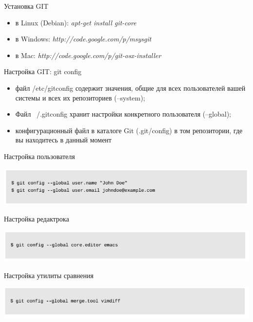 \documentclass{beamer}
\begin{document}
\begin{frame}
\begin{block}{Установка GIT}
\begin{itemize}
\item в Linux (Debian): \textit{apt-get install git-core}
\item в Windows: \textit{http://code.google.com/p/msysgit}
\item в Mac: \textit{http://code.google.com/p/git-osx-installer}
\end{itemize}
\end{block}
\begin{block}{Настройка GIT: git config}
\begin{itemize}
\item файл /etc/gitconfig содержит значения, общие для всех пользователей вашей системы
и всех их репозиториев (--system);
\item Файл ~/.gitconfig хранит настройки конкретного пользователя (--global);
\item конфигурационный файл в каталоге Git (.git/config) в том репозитории, где вы
находитесь в данный момент 
\end{itemize}
\end{block}
\end{frame} 

\begin{frame}
\begin{block}{Настройка пользователя}
\begin{center}
\includegraphics[scale=0.55]{images/username.png}
\end{center}
\end{block}
\begin{block}{Настройка редактрока}
\begin{center}
\includegraphics[scale=0.55]{images/editor.png}
\end{center}
\end{block}
\begin{block}{Настройка утилиты сравнения}
\begin{center}
\includegraphics[scale=0.55]{images/diff.png}
\end{center}
\end{block}
\end{frame}
\end{document}
